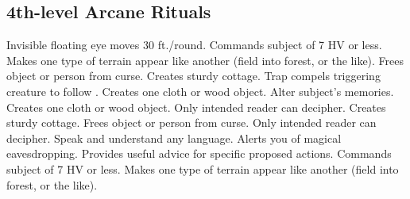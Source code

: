 \subsection{4th-level Arcane Rituals}
\begin{rituallist}
   Invisible floating eye moves 30 ft./round.
   Commands subject of 7 HV or less.
   Makes one type of terrain appear like another (field into forest, or the like).
   Frees object or person from curse.
   Creates sturdy cottage.
   Trap compels triggering creature to follow .
   Creates one cloth or wood object.
   Alter subject's memories.
   Creates one cloth or wood object.
   Only intended reader can decipher.
   Creates sturdy cottage.
   Frees object or person from curse.
   Only intended reader can decipher.
   Speak and understand any language.
   Alerts you of magical eavesdropping.
   Provides useful advice for specific proposed actions.
   Commands subject of 7 HV or less.
   Makes one type of terrain appear like another (field into forest, or the like).
\end{rituallist}

